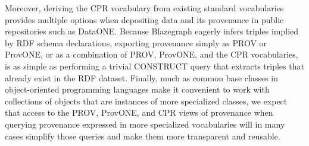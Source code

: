 Moreover, deriving the CPR vocabulary from existing standard vocabularies provides multiple options when depositing data and its provenance in public repositories such as DataONE. Because Blazegraph eagerly infers triples implied by RDF schema declarations, exporting provenance simply as PROV or ProvONE, or as a combination of PROV, ProvONE, and the CPR vocabularies, is as simple as performing a trivial CONSTRUCT query that extracts triples that already exist in the RDF dataset. Finally, much as common base classes in object-oriented programming languages make it convenient to work with collections of objects that are instances of more specialized classes,  we expect that access to the PROV, ProvONE, and CPR views of provenance when querying provenance expressed in more specialized vocabularies will in many cases simplify those queries and make them more transparent and reusable.



